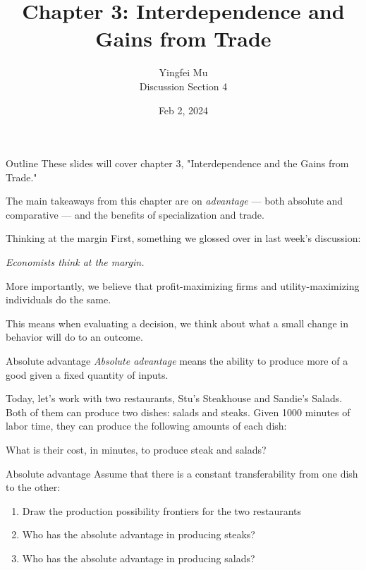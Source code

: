 \documentclass[aspectratio=169]{beamer}
\title{Chapter 3: Interdependence and Gains from Trade}
\author{Yingfei Mu\\
Discussion Section 4}
\date{Feb 2, 2024}
\begin{document}
\begin{frame}
    \titlepage 
\end{frame}

\begin{frame}{Outline}
    These slides will cover chapter 3, "Interdependence and the Gains from Trade."

    \medskip

    The main takeaways from this chapter are on \textit{advantage} --- both absolute and comparative --- and the benefits of specialization and trade.
\end{frame}

\begin{frame}{Thinking at the margin}
    First, something we glossed over in last week's discussion:

    \begin{center}
        \textit{Economists think at the margin.}
    \end{center}

    \medskip

    More importantly, we believe that profit-maximizing firms and utility-maximizing individuals do the same.

    \medskip

    This means when evaluating a decision, we think about what a small change in behavior will do to an outcome.

\end{frame}

\begin{frame}{Absolute advantage}
    \textit{Absolute advantage} means the ability to produce more of a good given a fixed quantity of inputs.
    
    \medskip

    Today, let's work with two restaurants, Stu's Steakhouse and Sandie's Salads. Both of them can produce two dishes: salads and steaks. Given 1000 minutes of labor time, they can produce the following amounts of each dish:

    

    What is their cost, in minutes, to produce steak and salads?
\end{frame} 

\begin{frame}{Absolute advantage}
    Assume that there is a constant transferability from one dish to the other:
    \begin{enumerate}
        \item Draw the production possibility frontiers for the two restaurants
        \item Who has the absolute advantage in producing steaks?
        \item Who has the absolute advantage in producing salads?
    \end{enumerate}
\end{frame} 
\end{document}
